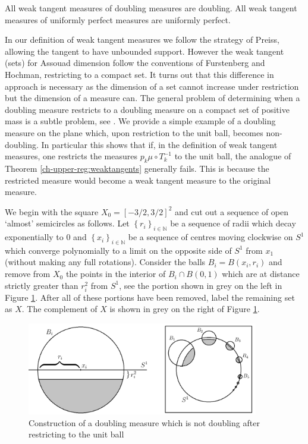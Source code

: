 \begin{corollary}
	All weak tangent measures of doubling measures are doubling. All weak tangent measures of uniformly perfect measures are uniformly perfect.
\end{corollary}



In our definition of weak tangent measures we follow the strategy of Preiss, allowing the tangent to have unbounded support. However the weak tangent (sets) for Assouad dimension follow the conventions of Furstenberg and Hochman, restricting to a compact set. It turns out that this difference in approach is necessary as the dimension of a set cannot increase under restriction but the dimension of a measure can. The general problem of determining when a doubling measure restricts to a doubling measure on a compact set of positive mass is a subtle problem, see \cite{ojala}.  We provide a simple example of a doubling measure on the plane which, upon restriction to the unit ball, becomes non-doubling.  In particular this shows that if, in the definition of weak tangent measures, one restricts the measures $p_k \mu \circ T^{-1}_k$ to the unit ball, the analogue of Theorem \ref{ch-upper-reg:weaktangents} generally fails. This is because the restricted measure would become a weak tangent measure to the original measure.

We begin with the square $X_0 = [-3/2, 3/2]^2$ and cut out a sequence of open   `almost' semicircles as follows.   Let $\left\{r_i \right\}_{i\in \mathbb{N}}$ be a sequence of radii which decay exponentially to 0 and $\left\{x_i\right\}_{i\in \mathbb{N}}$ be a sequence of centres moving clockwise on  $S^1$ which converge polynomially to a limit on the opposite side of $S^1$ from $x_1$ (without making any full rotations). Consider the balls $B_i = B(x_i, r_i)$ and remove from $X_0$ the points in the interior of  $B_i \cap B(0,1)$ which are at distance strictly greater than $r_i^2$ from $S^1$, see the portion shown in grey on the left in Figure \ref{ch-upper-reg:example}.  After all of these portions have been removed, label the remaining set as $X$.  The complement of $X$ is shown in grey on the right of Figure \ref{ch-upper-reg:example}. 

\begin{figure}[h]
	\centering
	\includegraphics[width=0.9\textwidth]{pics/ch-upper-reg/example.png}
	\caption{Construction of a doubling measure which is not doubling after restricting to the unit ball}
	\label{ch-upper-reg:example}
\end{figure}

